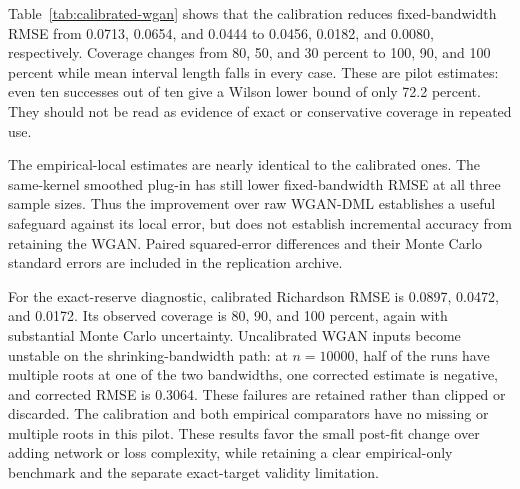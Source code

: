 Table~\ref{tab:calibrated-wgan} shows that the calibration reduces
fixed-bandwidth RMSE from 0.0713, 0.0654, and 0.0444 to 0.0456, 0.0182,
and 0.0080, respectively. Coverage changes from 80, 50, and 30 percent to
100, 90, and 100 percent while mean interval length falls in every case.
These are pilot estimates: even ten successes out of ten give a Wilson
lower bound of only 72.2 percent. They should not be read as evidence of
exact or conservative coverage in repeated use.

The empirical-local estimates are nearly identical to the calibrated ones.
The same-kernel smoothed plug-in has still lower fixed-bandwidth RMSE at all
three sample sizes. Thus the improvement over raw WGAN-DML establishes a
useful safeguard against its local error, but does not establish incremental
accuracy from retaining the WGAN. Paired squared-error differences and their
Monte Carlo standard errors are included in the replication archive.

For the exact-reserve diagnostic, calibrated Richardson RMSE is 0.0897,
0.0472, and 0.0172. Its observed coverage is 80, 90, and 100 percent, again
with substantial Monte Carlo uncertainty. Uncalibrated WGAN inputs become
unstable on the shrinking-bandwidth path: at $n=10000$, half of the runs
have multiple roots at one of the two bandwidths, one corrected estimate
is negative, and corrected RMSE is 0.3064. These failures are retained rather
than clipped or discarded. The calibration and both empirical comparators have no missing or
multiple roots in this pilot. These results favor the small post-fit change
over adding network or loss complexity, while retaining a clear empirical-only
benchmark and the separate exact-target validity limitation.
